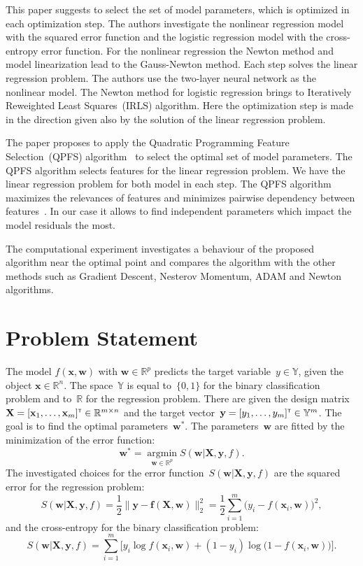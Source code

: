 \documentclass[a4paper,12pt]{article}
\theoremstyle{plain} %
\theoremstyle{definition} %
\theoremstyle{remark} %
\newcommand{\bw}{\mathbf{w}}
\newcommand{\by}{\mathbf{y}}
\newcommand{\bx}{\mathbf{x}}
\newcommand{\bbR}{\mathbb{R}}
\newcommand{\bbY}{\mathbb{Y}}
\newcommand{\bX}{\mathbf{X}}
\newcommand{\T}{{\text{\tiny\sffamily\upshape\mdseries T}}}
\newcommand{\argmin}{\mathop{\arg \min}\limits}
\begin{document}
	This paper suggests to select the set of model parameters, which is optimized in each optimization step.
	The authors investigate the nonlinear regression model with the squared error function and the logistic regression model with the cross-entropy error function.
	For the nonlinear regression the Newton method and model linearization lead to the Gauss-Newton method. 
	Each step solves the linear regression problem. 
	The authors use the two-layer neural network as the nonlinear model. 
	The Newton method for logistic regression brings to Iteratively Reweighted Least Squares~(IRLS) algorithm. 
	Here the optimization step is made in the direction given also by the solution of the linear regression problem.
	
	The paper proposes to apply the Quadratic Programming Feature Selection~(QPFS) algorithm~\cite{katrutsa2017comprehensive,rodriguez2010qpfs} to select the optimal set of model parameters. The QPFS algorithm selects features for the linear regression problem. We have the linear regression problem for both model in each step. The QPFS algorithm maximizes the relevances of features and minimizes pairwise dependency between features~\cite{ding2005mrmr}. In our case it allows to find independent parameters which impact the model residuals the most.
	
	The computational experiment investigates a behaviour of the proposed algorithm near the optimal point and compares the algorithm with the other methods such as Gradient Descent, Nesterov Momentum, ADAM and Newton algorithms. 
	
	\section*{Problem Statement}
	The model $f( \bx, \bw)$ with $\bw \in \mathbb{R}^p$ predicts the target variable~$y \in \bbY$, given the object $\bx \in \bbR^{n}$. The space~$\bbY$ is equal to~$\{0, 1\}$ for the binary classification problem and to~$\bbR$ for the regression problem.
	There are given the design matrix~$\bX = [\bx_1, \dots, \bx_m]^{\T} \in \bbR^{m \times n}$ and the target vector~$\by = [y_1, \dots, y_m]^{\T} \in \bbY^{m}$. 
	The goal is to find the optimal parameters~$\bw^*$.
	The parameters~$\bw$ are fitted by the minimization of the error function:
	\begin{equation}
		\bw^* = \argmin_{\bw \in \bbR^p} S(\bw | \bX, \by, f).
		\label{eq:error_function}
	\end{equation}
	The investigated choices for the error function~$S(\bw | \bX, \by, f)$ are
	the squared error for the regression problem: 
	\begin{equation}
		S(\bw | \bX, \by, f) = \frac 12 \| \by - \mathbf{f}(\bX, \bw) \|_2^2 = \frac 12 \sum_{i=1}^m \bigl( y_i - f(\bx_i,  \bw)\bigr)^2,
		\label{eq:squared_error}
	\end{equation}
	 and the cross-entropy for the binary classification problem: 
	\begin{equation}
		S(\bw | \bX, \by, f) = \sum_{i=1}^m \bigl[y_i \log f (\bx_i , \bw) + (1-y_i) \log \bigl(1 - f (\bx_i , \bw)\bigr)\bigr].
		\label{eq:log_loss}
	\end{equation}
	
\end{document}
